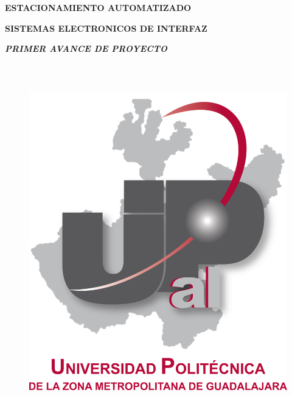 \documentclass[12pt]{article}
\begin{document}
\begin{Center}
{\fontsize{14pt}{16.8pt}\selectfont \textbf{ESTACIONAMIENTO AUTOMATIZADO }\par}
\end{Center}\par

\begin{Center}
\textbf{SISTEMAS ELECTRONICOS DE INTERFAZ}
\end{Center}\par

\begin{Center}
\textbf{\textit{PRIMER AVANCE DE PROYECTO}}
\end{Center}\par


\vspace{\baselineskip}



\begin{figure}[H]
	\begin{Center}
		\includegraphics[width=5.24in,height=6.06in]{./media/image1.png}
	\end{Center}
\end{figure}
\end{document}

